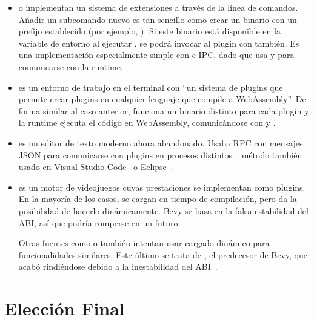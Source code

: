 \begin{itemize}
    \item {} o  implementan un sistema de
        extensiones a través de la línea de comandos. Añadir un subcomando nuevo
        es tan sencillo como crear un binario con un prefijo establecido (por
        ejemplo, ). Si este binario está disponible en la
        variable de entorno  al ejecutar , se podrá
        invocar al plugin con  también. Es una implementación
        especialmente simple con \pipes e IPC, dado que usa \stdin y \stdout
        para comunicarse con la runtime.

    \item {} es un entorno de trabajo en el terminal con ``un
        sistema de plugins que permite crear plugins en cualquier lenguaje que
        compile a WebAssembly''. De forma similar al caso anterior, funciona un
        binario distinto para cada plugin y la runtime ejecuta el código en
        WebAssembly, comunicándose con \stdin y \stdout.

    \item {} es un editor de texto moderno ahora abandonado. Usaba
        RPC con mensajes JSON para comunicarse con plugins en procesos
        distintos~\cite{xiplugin}, método también usado en Visual Studio
        Code~\cite{vscodeplugin} o Eclipse~\cite{eclipseplugin}.

    \item {} es un motor de videojuegos cuyas prestaciones se
        implementan como plugins. En la mayoría de los casos, se cargan en
        tiempo de compilación, pero  da la
        posibilidad de hacerlo dinámicamente. Bevy se basa en la falsa
        estabilidad del ABI, así que podría romperse en un futuro.

        Otras fuentes como \textcite{dynloading1} o \textcite{dynloading2}
        también intentan usar cargado dinámico para funcionalidades similares.
        Este último se trata de , el predecesor de Bevy, que
        acabó rindiéndose debido a la inestabilidad del
        ABI~\cite{dynloading_giveup1}\cite{dynloading_giveup2}.

\end{itemize}

\section{Elección Final}

